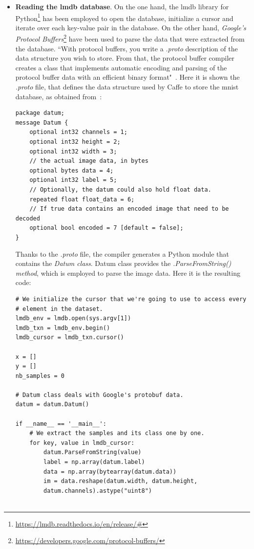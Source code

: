 \begin{itemize}
	\item \textbf{Reading the \gls{lmdb} database}. On the one hand, the \gls{lmdb} library for Python\footnote{\url{https://lmdb.readthedocs.io/en/release/\#}} has been employed to open the database, initialize a cursor and iterate over each key-value pair in the database. On the other hand, \emph{Google's Protocol Buffers}\footnote{\url{https://developers.google.com/protocol-buffers/}} have been used to parse the data that were extracted from the database. ``With protocol buffers, you write a \textit{.proto} description of the data structure you wish to store. From that, the protocol buffer compiler creates a class that implements automatic encoding and parsing of the protocol buffer data with an efficient binary format"~\cite{protobuf}. Here it is shown the \textit{.proto} file, that defines the data structure used by Caffe to store the \gls{mnist} database, as obtained from~\cite{lmdb_tutorial}: 
	
\begin{lstlisting}
package datum;
message Datum {
	optional int32 channels = 1;
	optional int32 height = 2;
	optional int32 width = 3;
	// the actual image data, in bytes
	optional bytes data = 4;
	optional int32 label = 5;
	// Optionally, the datum could also hold float data.
	repeated float float_data = 6;
	// If true data contains an encoded image that need to be decoded
	optional bool encoded = 7 [default = false];
}
\end{lstlisting}
	
	Thanks to the \textit{.proto} file, the compiler generates a Python module that contains the \emph{Datum class}. Datum class provides the \emph{\textit{.ParseFromString()} method}, which is employed to parse the image data. Here it is the resulting code:

\begin{lstlisting}
# We initialize the cursor that we're going to use to access every
# element in the dataset.
lmdb_env = lmdb.open(sys.argv[1])
lmdb_txn = lmdb_env.begin()
lmdb_cursor = lmdb_txn.cursor()

x = []
y = []
nb_samples = 0

# Datum class deals with Google's protobuf data.
datum = datum.Datum()

if __name__ == '__main__':
	# We extract the samples and its class one by one.
	for key, value in lmdb_cursor:
		datum.ParseFromString(value)
		label = np.array(datum.label)
		data = np.array(bytearray(datum.data))
		im = data.reshape(datum.width, datum.height,
		datum.channels).astype("uint8")
	

\end{lstlisting}
\end{itemize}
